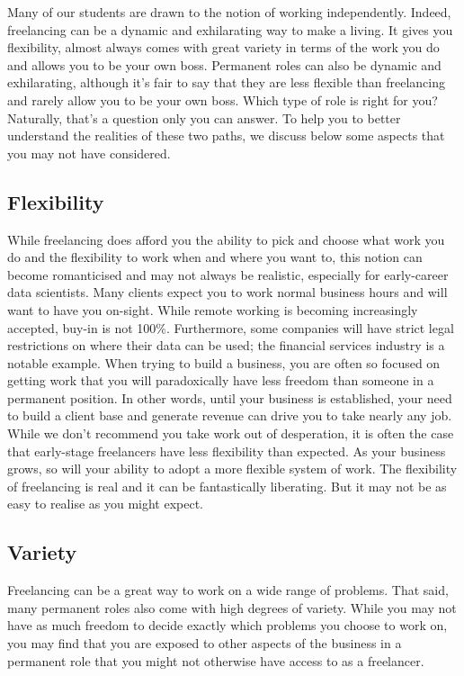 \documentclass[
]{book}
\begin{document}
Many of our students are drawn to the notion of working independently.
Indeed, freelancing can be a dynamic and exhilarating way to make a living. It gives you flexibility, almost always comes with great variety in terms of the work you do and allows you to be your own boss. Permanent roles can also be dynamic and exhilarating, although it's fair to say that they are less flexible than freelancing and rarely allow you to be your own boss. Which type of role is right for you? Naturally, that's a question only you can answer. To help you to better understand the realities of these two paths, we discuss below some aspects that you may not have considered.

\hypertarget{flexibility}{%
\subsection{Flexibility}\label{flexibility}}

While freelancing does afford you the ability to pick and choose what work you do and the flexibility to work when and where you want to, this notion can become romanticised and may not always be realistic, especially for early-career data scientists. Many clients expect you to work normal business hours and will want to have you on-sight. While remote working is becoming increasingly accepted, buy-in is not 100\%. Furthermore, some companies will have strict legal restrictions on where their data can be used; the financial services industry is a notable example. When trying to build a business, you are often so focused on getting work that you will paradoxically have less freedom than someone in a permanent position. In other words, until your business is established, your need to build a client base and generate revenue can drive you to take nearly any job. While we don't recommend you take work out of desperation, it is often the case that early-stage freelancers have less flexibility than expected. As your business grows, so will your ability to adopt a more flexible system of work. The flexibility of freelancing is real and it can be fantastically liberating. But it may not be as easy to realise as you might expect.

\hypertarget{variety}{%
\subsection{Variety}\label{variety}}

Freelancing can be a great way to work on a wide range of problems. That said, many permanent roles also come with high degrees of variety. While you may not have as much freedom to decide exactly which problems you choose to work on, you may find that you are exposed to other aspects of the business in a permanent role that you might not otherwise have access to as a freelancer.
\end{document}
